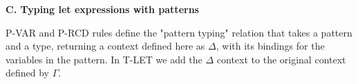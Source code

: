 \documentclass[a4paper]{article}
\begin{document}
\textbf{C. Typing let expressions with patterns}
P-VAR and P-RCD rules define the "pattern typing" relation that takes a pattern and a type, returning a context defined here as $\Delta$, with its bindings for the variables in the pattern. In T-LET we add the $\Delta$ context to the original context defined by $\Gamma$.\\
\end{document}
